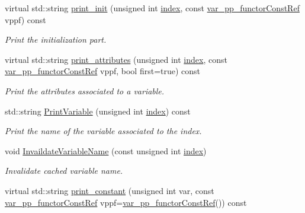 \begin{DoxyCompactItemize}
virtual std\+::string \hyperlink{classBehavioralHelper_a23b0ff2925b78cc7a7714a51ac1c434b}{print\+\_\+init} (unsigned int \hyperlink{tutorial__pact__2019_2Introduction_2third_2include_2Keccak_8h_a028c9bdc8344cca38ab522a337074797}{index}, const \hyperlink{var__pp__functor_8hpp_a8a6b51b6519401d911398943510557f0}{var\+\_\+pp\+\_\+functor\+Const\+Ref} vppf) const
\begin{DoxyCompactList}\small\item\em Print the initialization part. \end{DoxyCompactList}\item 
virtual std\+::string \hyperlink{classBehavioralHelper_ad96b5f4d33d92f732ad3a30a70b42643}{print\+\_\+attributes} (unsigned int \hyperlink{tutorial__pact__2019_2Introduction_2third_2include_2Keccak_8h_a028c9bdc8344cca38ab522a337074797}{index}, const \hyperlink{var__pp__functor_8hpp_a8a6b51b6519401d911398943510557f0}{var\+\_\+pp\+\_\+functor\+Const\+Ref} vppf, bool first=true) const
\begin{DoxyCompactList}\small\item\em Print the attributes associated to a variable. \end{DoxyCompactList}\item 
std\+::string \hyperlink{classBehavioralHelper_ab93bdf8fecf2a9740d9bc2cd65421a64}{Print\+Variable} (unsigned int \hyperlink{tutorial__pact__2019_2Introduction_2third_2include_2Keccak_8h_a028c9bdc8344cca38ab522a337074797}{index}) const
\begin{DoxyCompactList}\small\item\em Print the name of the variable associated to the index. \end{DoxyCompactList}\item 
void \hyperlink{classBehavioralHelper_ae1d9b8192e91994a5411a7022028b47c}{Invaildate\+Variable\+Name} (const unsigned int \hyperlink{tutorial__pact__2019_2Introduction_2third_2include_2Keccak_8h_a028c9bdc8344cca38ab522a337074797}{index})
\begin{DoxyCompactList}\small\item\em Invalidate cached variable name. \end{DoxyCompactList}\item 
virtual std\+::string \hyperlink{classBehavioralHelper_a5dcc301cc61cb672f0a2b593ceb61a2f}{print\+\_\+constant} (unsigned int var, const \hyperlink{var__pp__functor_8hpp_a8a6b51b6519401d911398943510557f0}{var\+\_\+pp\+\_\+functor\+Const\+Ref} vppf=\hyperlink{var__pp__functor_8hpp_a8a6b51b6519401d911398943510557f0}{var\+\_\+pp\+\_\+functor\+Const\+Ref}()) const

\end{DoxyCompactItemize}
